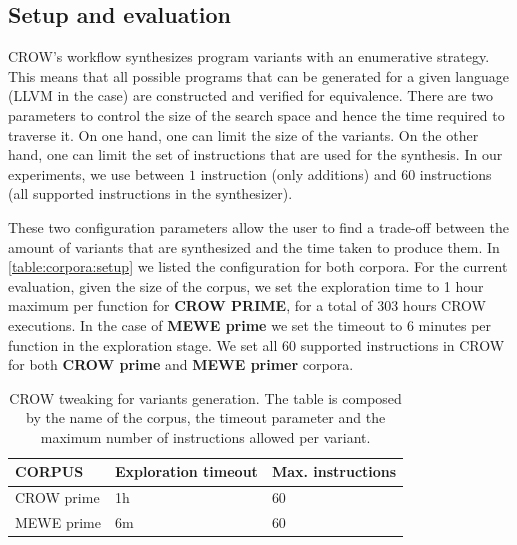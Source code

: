 \subsection{Setup and evaluation}

CROW's workflow synthesizes program variants with an enumerative strategy. This means that all possible programs that can be generated for a given language (LLVM in the case) are constructed and verified for equivalence.
There are two parameters to control the size of the search space and hence the time required to traverse it.
On one hand, one can limit the size of the variants. On the other hand, one can limit the set of instructions that are used for the synthesis. In our experiments, we use between $1$ instruction (only additions) and $60$ instructions (all supported instructions in the synthesizer).


These two  configuration parameters allow the user to find a trade-off between the amount of variants that are synthesized and the time taken to produce them. In \autoref{table:corpora:setup} we listed the configuration for both corpora. For the current evaluation, given the size of the corpus, we set the exploration time to 1 hour maximum per function for \textbf{CROW PRIME}, for a total of 303 hours CROW executions. In the case of \textbf{MEWE prime} we set the timeout to 6 minutes per function in the exploration stage. We set all 60 supported instructions in CROW for both \textbf{CROW prime} and \textbf{MEWE primer} corpora.

\begin{table}[H]
    \renewcommand{\arraystretch}{1.2}
    \centering
    \begin{tabular}{l | l l}
        \midrule
        CORPUS & Exploration timeout & Max. instructions \\
        \hline
        CROW prime & 1h & 60 \\
        MEWE prime & 6m & 60 \\
    \end{tabular}
    \caption{CROW tweaking for variants generation. The table is composed by the name of the corpus, the timeout parameter and the maximum number of instructions allowed per variant.}
    \label{table:corpora:setup}
\end{table}


